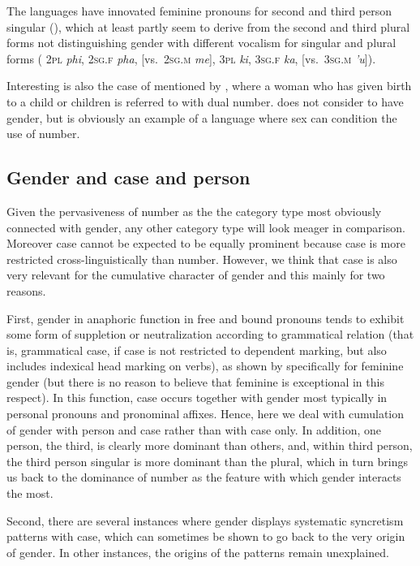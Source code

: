 \documentclass[output=collectionpaper]{langsci/langscibook}
\begin{document}
The  languages have innovated feminine pronouns for second and third person singular (\citealt[184]{Daladier2011}), which at least partly seem to derive from the second and third plural forms not distinguishing gender with different vocalism for singular and plural forms ( \textsc{2pl} \textit{phi}, \textsc{2sg.f} \textit{pha}, [vs.\ \textsc{2sg.m} \textit{me}], \textsc{3pl} \textit{ki}, \textsc{3sg.f} \textit{ka}, [vs.\ \textsc{3sg.m} \textit{'u}]).

Interesting is also the case of  mentioned by , where a woman who has given birth to a child or children is referred to with dual number. \cite[42]{Payne1985} does not consider  to have gender, but  is obviously an example of a language where sex can condition the use of number.

  \subsection{Gender and case and person}
\label{sec:WDG:8.2}

Given the pervasiveness of number as the the category type most obviously connected with gender, any other category type will look meager in comparison. Moreover case cannot be expected to be equally prominent because case is more restricted cross-linguistically than number. However, we think that case is also very relevant for the cumulative character of gender and this mainly for two reasons.

First, gender in anaphoric function in free and bound pronouns tends to exhibit some form of suppletion or neutralization according to grammatical relation (that is, grammatical case, if case is not restricted to dependent marking, but also includes indexical head marking on verbs), as shown by  specifically for feminine gender (but there is no reason to believe that feminine is exceptional in this respect). In this function, case occurs together with gender most typically in personal pronouns and pronominal affixes. Hence, here we deal with cumulation of gender with person and case rather than with case only. In addition, one person, the third, is clearly more dominant than others, and, within third person, the third person singular is more dominant than the plural, which in turn brings us back to the dominance of number as the feature with which gender interacts the most.

Second, there are several instances where gender displays systematic syncretism patterns with case, which can sometimes be shown to go back to the very origin of gender. In other instances, the origins of the patterns remain unexplained.
\end{document}
